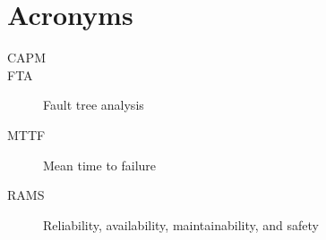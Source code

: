 
\chapter{Acronyms}
\begin{description}
\item [CAPM]
\item[FTA] Fault tree analysis
\item[MTTF] Mean time to failure
\item[RAMS] Reliability, availability, maintainability, and safety
\end{description}